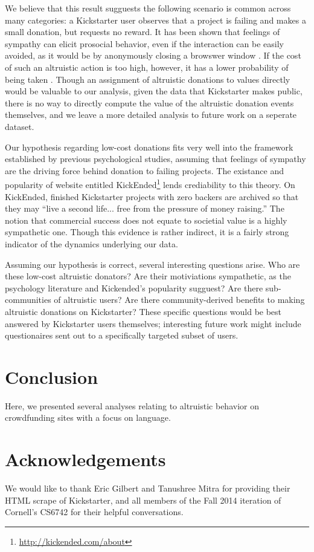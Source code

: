 \documentclass[letterpaper]{article}
\begin{document}
We believe that this result sugguests the following scenario is common across many categories: a Kickstarter user observes that a project is failing and makes a small donation, but requests no reward. It has been shown that feelings of sympathy can elicit prosocial behavior, even if the interaction can be easily avoided, as it would be by anonymously closing a browswer window \cite{eisenberg1989relation}. If the cost of such an altruistic action is too high, however, it has a lower probability of being taken \cite{batson1983influence}. Though an assignment of altruistic donations to values directly would be valuable to our analysis, given the data that Kickstarter makes public, there is no way to directly compute the value of the altruistic donation events themselves, and we leave a more detailed analysis to future work on a seperate dataset.

Our hypothesis regarding low-cost donations fits very well into the framework established by previous psychological studies, assuming that feelings of sympathy are the driving force behind donation to failing projects. The existance and popularity of website entitled KickEnded\footnote{\url{http://kickended.com/about}} lends crediability to this theory. On KickEnded, finished Kickstarter projects with zero backers are archived so that they may ``live a second life... free from the pressure of money raising.'' The notion that commercial success does not equate to societial value is a highly sympathetic one. Though this evidence is rather indirect, it is a fairly strong indicator of the dynamics underlying our data.

Assuming our hypothesis is correct, several interesting questions arise. Who are these low-cost altruistic donators? Are their motiviations sympathetic, as the psychology literature and Kickended's popularity sugguest? Are there sub-communities of altruistic users? Are there community-derived benefits to making altruistic donations on Kickstarter? These specific questions would be best answered by Kickstarter users themselves; interesting future work might include questionaires sent out to a specifically targeted subset of users.

\section{Conclusion}

Here, we presented several analyses relating to altruistic behavior on crowdfunding sites with a focus on language.

\section{Acknowledgements}

We would like to thank Eric Gilbert and Tanushree Mitra for providing their HTML scrape of Kickstarter, and all members of the Fall 2014 iteration of Cornell's CS6742 for their helpful conversations.

 
\end{document}
